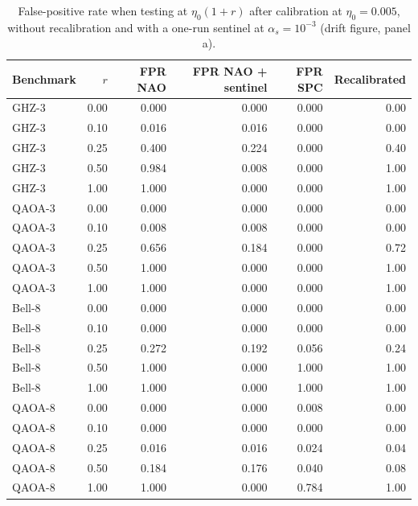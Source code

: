 \begin{table}[t]
\centering
\caption{False-positive rate when testing at $\eta_0(1+r)$ after calibration at $\eta_0 = 0.005$, without recalibration and with a one-run sentinel at $\alpha_s = 10^{-3}$ (drift figure, panel a).}
\label{tab:rq5-drift-one-run}
\small
\begin{tabular}{lrrrrr}
\toprule
Benchmark & $r$ & FPR NAO & FPR NAO + sentinel & FPR SPC & Recalibrated \\
\midrule
GHZ-3 & 0.00 & 0.000 & 0.000 & 0.000 & 0.00 \\
GHZ-3 & 0.10 & 0.016 & 0.016 & 0.000 & 0.00 \\
GHZ-3 & 0.25 & 0.400 & 0.224 & 0.000 & 0.40 \\
GHZ-3 & 0.50 & 0.984 & 0.008 & 0.000 & 1.00 \\
GHZ-3 & 1.00 & 1.000 & 0.000 & 0.000 & 1.00 \\
QAOA-3 & 0.00 & 0.000 & 0.000 & 0.000 & 0.00 \\
QAOA-3 & 0.10 & 0.008 & 0.008 & 0.000 & 0.00 \\
QAOA-3 & 0.25 & 0.656 & 0.184 & 0.000 & 0.72 \\
QAOA-3 & 0.50 & 1.000 & 0.000 & 0.000 & 1.00 \\
QAOA-3 & 1.00 & 1.000 & 0.000 & 0.000 & 1.00 \\
Bell-8 & 0.00 & 0.000 & 0.000 & 0.000 & 0.00 \\
Bell-8 & 0.10 & 0.000 & 0.000 & 0.000 & 0.00 \\
Bell-8 & 0.25 & 0.272 & 0.192 & 0.056 & 0.24 \\
Bell-8 & 0.50 & 1.000 & 0.000 & 1.000 & 1.00 \\
Bell-8 & 1.00 & 1.000 & 0.000 & 1.000 & 1.00 \\
QAOA-8 & 0.00 & 0.000 & 0.000 & 0.008 & 0.00 \\
QAOA-8 & 0.10 & 0.000 & 0.000 & 0.000 & 0.00 \\
QAOA-8 & 0.25 & 0.016 & 0.016 & 0.024 & 0.04 \\
QAOA-8 & 0.50 & 0.184 & 0.176 & 0.040 & 0.08 \\
QAOA-8 & 1.00 & 1.000 & 0.000 & 0.784 & 1.00 \\
\bottomrule
\end{tabular}
\end{table}
